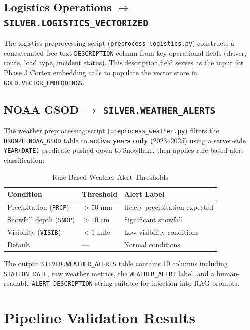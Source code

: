\documentclass[14.5pt,letterpaper]{article}
\begin{document}
\subsection{Logistics Operations $\rightarrow$ \texttt{SILVER.LOGISTICS\_VECTORIZED}}

The logistics preprocessing script (\texttt{preprocess\_logistics.py}) constructs a concatenated free-text \texttt{DESCRIPTION} column from key operational fields (driver, route, load type, incident status). This description field serves as the input for Phase 3 Cortex embedding calls to populate the vector store in \texttt{GOLD.VECTOR\_EMBEDDINGS}.

\subsection{NOAA GSOD $\rightarrow$ \texttt{SILVER.WEATHER\_ALERTS}}

The weather preprocessing script (\texttt{preprocess\_weather.py}) filters the \texttt{BRONZE.NOAA\_GSOD} table to \textbf{active years only} (2023--2025) using a server-side \texttt{YEAR(DATE)} predicate pushed down to Snowflake, then applies rule-based alert classification:

\begin{table}[H]
\centering
\caption{Rule-Based Weather Alert Thresholds}
\begin{tabular}{@{}lll@{}}
\toprule
\textbf{Condition} & \textbf{Threshold} & \textbf{Alert Label} \\
\midrule
Precipitation (\texttt{PRCP}) & $> 50$ mm & Heavy precipitation expected \\
Snowfall depth (\texttt{SNDP})  & $> 10$ cm & Significant snowfall \\
Visibility (\texttt{VISIB})     & $< 1$ mile & Low visibility conditions \\
Default                          & ---         & Normal conditions \\
\bottomrule
\end{tabular}
\end{table}

The output \texttt{SILVER.WEATHER\_ALERTS} table contains 10 columns including \texttt{STATION}, \texttt{DATE}, raw weather metrics, the \texttt{WEATHER\_ALERT} label, and a human-readable \texttt{ALERT\_DESCRIPTION} string suitable for injection into RAG prompts.

\section{Pipeline Validation Results}
\end{document}
